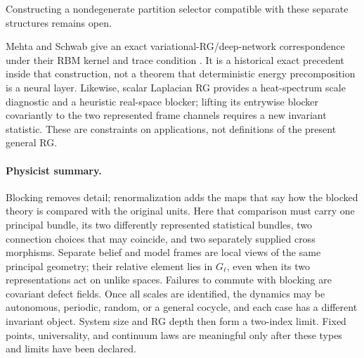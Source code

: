 Constructing a nondegenerate partition selector compatible with these
separate structures remains open. 

Mehta and Schwab give an exact variational-RG/deep-network correspondence
under their RBM kernel and trace condition \citep{MehtaSchwab2014}. It is a
historical exact precedent inside that construction, not a theorem that
deterministic energy precomposition is a neural layer. Likewise, scalar
Laplacian RG provides a heat-spectrum scale diagnostic and a heuristic
real-space blocker; lifting its entrywise blocker covariantly to the two
represented frame channels requires a new invariant statistic. These are
constraints on applications, not definitions of the present general RG.

\paragraph{Physicist summary.}
Blocking removes detail; renormalization adds the maps that say how the
blocked theory is compared with the original units. Here that comparison must
carry one principal bundle, its two differently represented statistical
bundles, two connection choices that may coincide, and two separately
supplied cross morphisms. Separate belief and model frames are local views of the same
principal geometry; their relative element lies in \(G_\ell\), even when its
two representations act on unlike spaces. Failures to commute with blocking
are covariant defect fields. Once all scales are identified, the dynamics may
be autonomous, periodic, random, or a general cocycle, and each case has a
different invariant object. System size and RG depth then form a two-index
limit. Fixed points, universality, and continuum laws are meaningful only
after these types and limits have been declared.
